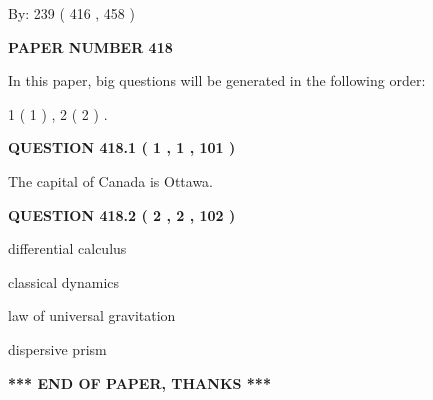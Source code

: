 \documentclass[12pt]{article}
\begin{document}
   
\hspace{1.0in} By: 
 239 ( 416 ,  458 )
   
   
   
   
\newpage 
\setcounter{page}{ 
   418001 } 
   
   
   
   
 {\textbf{ \Large{ PAPER NUMBER  418  }}}
   
   
\vspace{0.2in}
   
   
   
   
   
\vspace{0.2in}
   
In this paper, big questions will be generated in the following order: 
   
   
   1 ( 1 )
 ,
   2 ( 2 )
 .
  
\vspace{0.2in}
  
{\textbf{\Large{QUESTION
418.1 
 ( 1 , 1 , 101 )
}}}
  
  
 
 
\noindent{}
 
 
The capital of Canada is Ottawa.
 
 
 
 
  
\vspace{0.2in}
  
{\textbf{\Large{QUESTION
418.2 
 ( 2 , 2 , 102 )
}}}
  
  
 
 
\noindent{}
 
 
differential calculus
 
 
classical dynamics
 
 
law of universal gravitation
 
 
dispersive prism
 
 
 
 
   
   
\vspace{1.0in} 
{\textbf{\large{ *** END OF PAPER, THANKS *** }}} 
   
\end{document}
